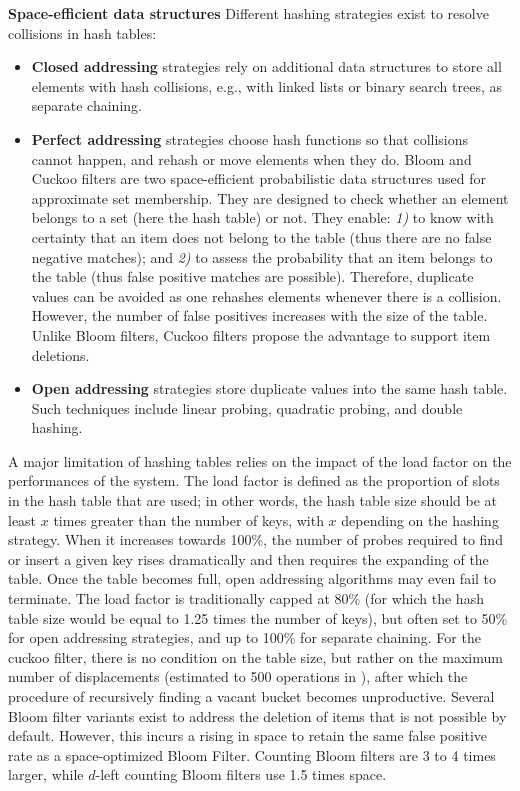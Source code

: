 \documentclass{llncs}
\newcounter{prob}
\newcommand{\cn}[1]{\emph{\bf \color{purple}~[Cyrius: #1]}}
\begin{document}
\textbf{Space-efficient data structures}
Different hashing strategies exist to resolve collisions in hash tables:
\begin{itemize}
    \item \textbf{Closed addressing} strategies rely on additional data structures to store all elements with hash collisions, e.g., with linked lists or binary search trees, as separate chaining.
    \item \textbf{Perfect addressing} strategies choose hash functions so that collisions cannot happen, and rehash or move elements when they do. Bloom and Cuckoo filters \cite{Bloom1970} are two space-efficient probabilistic data structures used for approximate set membership. They are designed to check whether an element belongs to a set (here the hash table) or not. They enable: \textit{1)} to know with certainty that an item does not belong to the table (thus there are no false negative matches); and \textit{2)} to assess the probability that an item belongs to the table (thus false positive matches are possible). Therefore, duplicate values can be avoided as one rehashes elements whenever there is a collision. However, the number of false positives increases with the size of the table. Unlike Bloom filters, Cuckoo filters propose the advantage to support item deletions.
    \item \textbf{Open addressing} strategies store duplicate values into the same hash table. Such techniques include linear probing, quadratic probing, and double hashing.
\end{itemize}

A major limitation of hashing tables relies on the impact of the load factor on the performances of the system. The load factor is defined as the proportion of slots in the hash table that are used; in other words, the hash table size should be at least $x$ times greater than the number of keys, with $x$ depending on the hashing strategy. When it increases towards 100\%, the number of probes required to find or insert a given key rises dramatically and then requires the expanding of the table. Once the table becomes full, open addressing algorithms may even fail to terminate. The load factor is traditionally capped at 80\% (for which the hash table size would be equal to 1.25 times the number of keys), but often set to 50\% for open addressing strategies, and up to 100\% for separate chaining.
For the cuckoo filter, there is no condition on the table size, but rather on the maximum number of displacements (estimated to 500 operations in \cite{Fan2014}), after which the procedure of recursively finding a vacant bucket becomes unproductive. Several Bloom filter variants exist to address the deletion of items that is not possible by default. However, this incurs a rising in space to retain the same false positive rate as a space-optimized Bloom Filter. Counting Bloom filters \cite{Tarkoma2012} are 3 to 4 times larger, while $d$-left counting Bloom filters \cite{Bonomi2006} use 1.5 times space.
\end{document}
